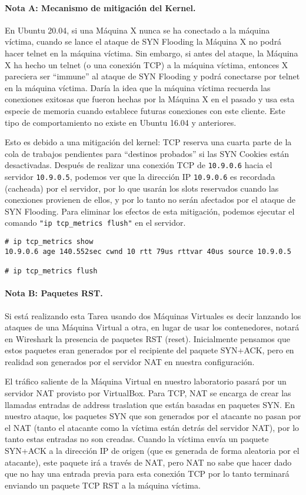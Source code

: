 \paragraph{Nota A: Mecanismo de mitigación del Kernel.} 
En Ubuntu 20.04, si una Máquina X nunca se ha conectado a la máquina víctima, cuando se lance el ataque de SYN Flooding la Máquina X no podrá hacer telnet en la máquina víctima. Sin embargo, si antes del ataque, la Máquina X ha hecho un telnet (o una conexión TCP) a la máquina víctima, entonces X pareciera ser ``immune'' al ataque de SYN Flooding y podrá conectarse por telnet en la máquina víctima. Daría la idea que la máquina víctima recuerda las conexiones exitosas que fueron hechas por la Máquina X en el pasado y usa esta especie de memoria cuando establece futuras conexiones con este cliente. Este tipo de comportamiento no existe en Ubuntu 16.04 y anteriores.

Esto es debido a una mitigación del kernel:
TCP reserva una cuarta parte de la cola de trabajos pendientes para ``destinos probados'' si las SYN Cookies están desactivadas. Después de realizar una conexión TCP de \texttt{10.9.0.6} hacia el servidor \texttt{10.9.0.5}, podemos ver que la dirección IP \texttt{10.9.0.6} es recordada (cacheada) por el servidor, por lo que usarán los slots reservados cuando las conexiones provienen de ellos, y por lo tanto no serán afectados por el ataque de SYN Flooding.
Para eliminar los efectos de esta mitigación, podemos ejecutar el comando \texttt{"ip tcp\_metrics flush"} en el servidor.

\begin{lstlisting}
# ip tcp_metrics show
10.9.0.6 age 140.552sec cwnd 10 rtt 79us rttvar 40us source 10.9.0.5

# ip tcp_metrics flush
\end{lstlisting}


\paragraph{Nota B: Paquetes RST.} 
Si está realizando esta Tarea usando dos Máquinas Virtuales es decir lanzando los ataques de una Máquina Virtual a otra, en lugar de usar los contenedores, notará en Wireshark la presencia de paquetes RST (reset). Inicialmente pensamos que estos paquetes eran generados por el recipiente del paquete SYN+ACK, pero en realidad son generados por el servidor NAT en nuestra configuración.

El tráfico saliente de la Máquina Virtual en nuestro laboratorio pasará por un servidor NAT provisto por VirtualBox. Para TCP, NAT se encarga de crear las llamadas entradas de address traslation que están basadas en paquetes SYN.
En nuestro ataque, los paquetes SYN que son generados por el atacante no pasan por el NAT (tanto el atacante como la víctima están detrás del servidor NAT), por lo tanto estas entradas no son creadas. Cuando la víctima envía un paquete SYN+ACK a la dirección IP de origen (que es generada de forma aleatoria por el atacante), este paquete irá a través de NAT, pero NAT no sabe que hacer dado que no hay una entrada previa para esta conexión TCP por lo tanto terminará enviando un paquete TCP RST a la máquina víctima.

